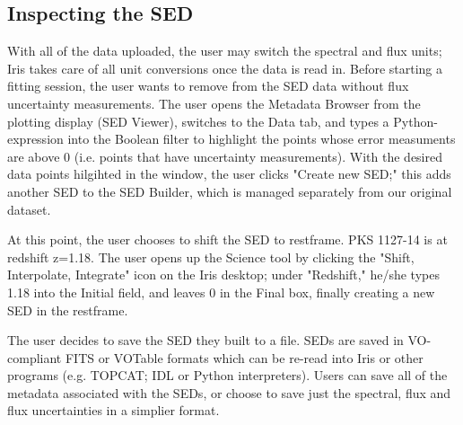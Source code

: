 \subsection{Inspecting the SED}

With all of the data uploaded, the user may switch the spectral and flux units; Iris takes care of all unit conversions once the data is read in. Before starting a fitting session, the user wants to remove from the SED data without flux uncertainty measurements. The user opens the Metadata Browser from the plotting display (SED Viewer), switches to the Data tab, and types a Python-expression into the Boolean filter to highlight the points whose error measuments are above 0 (i.e. points that have uncertainty measurements). With the desired data points hilgihted in the window, the user clicks "Create new SED;" this adds another SED to the SED Builder, which is managed separately from our original dataset.

At this point, the user chooses to shift the SED to restframe. PKS 1127-14 is at redshift z=1.18. The user opens up the Science tool by clicking the "Shift, Interpolate, Integrate" icon on the Iris desktop; under "Redshift," he/she types 1.18 into the Initial field, and leaves 0 in the Final box, finally creating a new SED in the restframe.

The user decides to save the SED they built to a file. SEDs are saved in VO-compliant FITS or VOTable formats which can be re-read into Iris or other programs (e.g. TOPCAT; IDL or Python interpreters). Users can save all of the metadata associated with the SEDs, or choose to save just the spectral, flux and flux uncertainties in a simplier format.